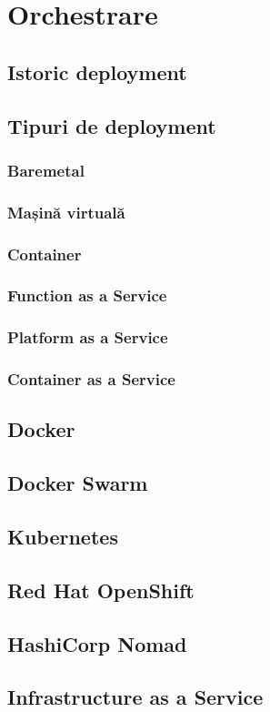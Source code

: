 \chapter{Orchestrare}
\section{Istoric deployment}
\section{Tipuri de deployment}
\subsection{Baremetal}
\subsection{Mașină virtuală}
\subsection{Container}
\subsection{Function as a Service}
\subsection{Platform as a Service}
\subsection{Container as a Service}
\section{Docker}
\section{Docker Swarm}
\section{Kubernetes}
\section{Red Hat OpenShift}
\section{HashiCorp Nomad}
\section{Infrastructure as a Service}
